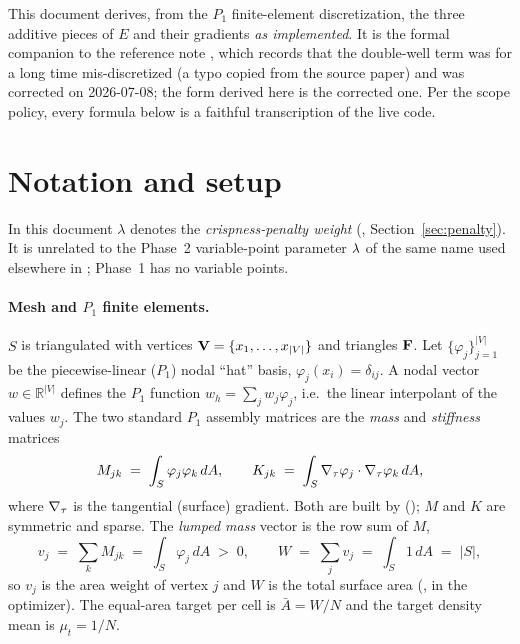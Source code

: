 \documentclass[11pt,a4paper]{article}
\begin{document}
This document derives, from the $P_1$ finite-element discretization, the three
additive pieces of $E$ and their gradients \emph{as implemented}. It is the formal
companion to the reference note
, which records that
the double-well term was for a long time mis-discretized (a typo copied from the
source paper) and was corrected on 2026-07-08; the form derived here is the
corrected one. Per the  scope policy, every formula below is a
faithful transcription of the live code.

\section{Notation and setup}
\label{sec:notation}

\begin{remark}
In this document $\lambda$ denotes the \emph{crispness-penalty weight}
(, Section~\ref{sec:penalty}). It is unrelated to the Phase~2
variable-point parameter $\lambda$ of the same name used elsewhere in
; Phase~1 has no variable points.
\end{remark}

\paragraph{Mesh and $P_1$ finite elements.}
$S$ is triangulated with vertices $\mathbf{V} = \{x_1,\dots,x_{|V|}\}$ and triangles $\mathbf{F}$.
Let $\{\varphi_j\}_{j=1}^{|V|}$ be the piecewise-linear ($P_1$) nodal ``hat'' basis,
$\varphi_j(x_i)=\delta_{ij}$. A nodal vector $w\in\mathbb{R}^{|V|}$ defines the $P_1$
function $w_h = \sum_j w_j \varphi_j$, i.e.\ the linear interpolant of the values
$w_j$. The two standard $P_1$ assembly matrices are the \emph{mass} and
\emph{stiffness} matrices
\begin{equation}
  M_{jk} \;=\; \int_S \varphi_j \varphi_k \,dA,
  \qquad
  K_{jk} \;=\; \int_S \nabla_\tau \varphi_j \cdot \nabla_\tau \varphi_k \,dA,
  \label{eq:MK-def}
\end{equation}
where $\nabla_\tau$ is the tangential (surface) gradient. Both are built by
 (); $M$ and $K$ are
symmetric and sparse. The \emph{lumped mass} vector is the row sum of $M$,
\begin{equation}
  v_j \;=\; \sum_k M_{jk} \;=\; \int_S \varphi_j \, dA \;>\; 0,
  \qquad
  W \;=\; \sum_j v_j \;=\; \int_S 1 \, dA \;=\; |S|,
  \label{eq:lumped-mass}
\end{equation}
so $v_j$ is the area weight of vertex $j$ and $W$ is the total surface area
(,  in the optimizer). The equal-area target per cell is
$\bar A = W/N$ and the target density mean is $\mu_t = 1/N$.
\end{document}
